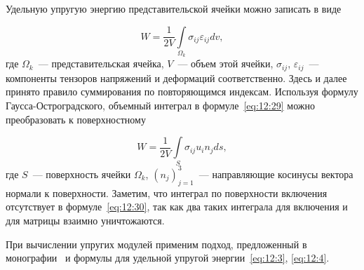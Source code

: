 

Удельную упругую энергию представительской ячейки можно записать в виде

\begin{equation}
W=\frac{1}{2V}\int\limits_{\Omega_k}\sigma_{ij}\varepsilon_{ij}dv,
\label{eq:12:29}
\end{equation}
где $\Omega_k$~--- представительская ячейка, $V$~--- объем этой ячейки, $\sigma_{ij}$, $\varepsilon_{ij}$~--- компоненты тензоров напряжений и деформаций соответственно. Здесь и далее принято правило суммирования по повторяющимся индексам. Используя формулу Гаусса-Остроградского, объемный интеграл в формуле~\eqref{eq:12:29} можно преобразовать к поверхностному

\begin{equation}
W=\frac{1}{2V}\int\limits_S\sigma_{ij}u_i n_j ds,
\label{eq:12:30}
\end{equation}
где $S$~--- поверхность ячейки $\Omega_k$, $(n_j)_{j=1}^3$~--- направляющие косинусы вектора нормали к поверхности. Заметим, что интеграл по поверхности включения отсутствует в формуле~\eqref{eq:12:30}, так как два таких интеграла для включения и для матрицы взаимно уничтожаются.

При вычислении упругих модулей применим подход, предложенный в монографии~\cite{Vanin1985} и формулы для удельной упругой энергии~\eqref{eq:12:3}, \eqref{eq:12:4}. 

%

